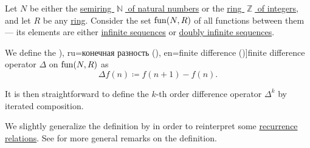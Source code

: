 \begin{definition}\label{def:difference_operator}\mimprovised
  Let \( N \) be either the \hyperref[def:natural_numbers]{semiring \( \BbbN \) of natural numbers} or the \hyperref[def:integers]{ring \( \BbbZ \) of integers}, and let \( R \) be any \hyperref[def:ring]{ring}. Consider the set \( \operatorname{fun}(N, R) \) of all functions between them --- its elements are either \hyperref[def:sequence]{infinite sequences} or \hyperref[def:doubly_infinite_sequence]{doubly infinite sequences}.

  We define the \term[bg=крайна разлика от ред \( k \) (\cite[21]{Боянов2008ЧислениМетоди}), ru=конечная разность (\cite[11]{Гельфонд1959ИсчислениеКонечныхРазностей}), en=finite difference (\cite[77]{Stanley2012EnumerativeCombinatoricsVol1})]{finite difference} operator \( \Delta \) on \( \operatorname{fun}(N, R) \) as
  \begin{equation}\label{eq:def:difference_operator}
    \Delta f(n) \coloneqq f(n + 1) - f(n).
  \end{equation}

  It is then straightforward to define the \( k \)-th order difference operator \( \Delta^k \) by iterated composition.
\end{definition}
\begin{comments}
  \item We slightly generalize the definition by  in order to reinterpret some \hyperref[def:recurrence_relation]{recurrence relations}. See  for more general remarks on the definition.
\end{comments}

